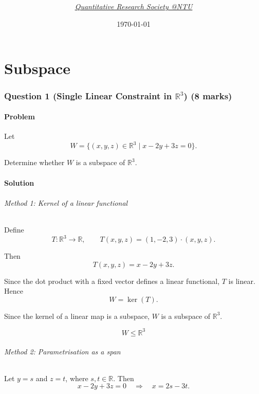 \documentclass[12pt]{article}
\title{
\Huge \CourseCode\ \CourseName \\[0.3em]
\Large \DocType  \\[0.3em]
\ExamMeta
}
\author{
  \textit{\href{https://qrsntu.org}{Quantitative Research Society @NTU}}
}
\date{\today}
\begin{document}
\maketitle


\newpage
\part{Subspace}

\newpage
\section{Question 1 (Single Linear Constraint in $\mathbb R^3$) \hfill (8 marks)}
\subsection{Problem}

Let
\[
W=\{(x,y,z)\in\mathbb R^3\mid x-2y+3z=0\}.
\]

Determine whether \(W\) is a subspace of \(\mathbb R^3\).

\subsection{Solution}

\paragraph{Method 1: Kernel of a linear functional}

Define
\[
T:\mathbb R^3\to\mathbb R,\qquad T(x,y,z)=(1,-2,3)\cdot(x,y,z).
\]

Then
\[
T(x,y,z)=x-2y+3z.
\]

Since the dot product with a fixed vector defines a linear functional, \(T\) is linear. Hence
\[
W=\ker(T).
\]

Since the kernel of a linear map is a subspace, \(W\) is a subspace of \(\mathbb R^3\).

\[
\boxed{W\le \mathbb R^3}
\]

\paragraph{Method 2: Parametrisation as a span}

Let \(y=s\) and \(z=t\), where \(s,t\in\mathbb R\). Then
\[
x-2y+3z=0
\quad\Longrightarrow\quad
x=2s-3t.
\]
\end{document}
